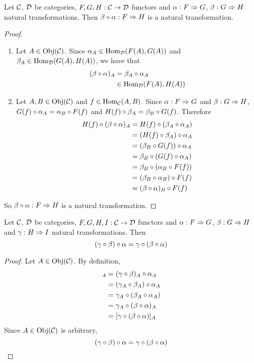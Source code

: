 \documentclass{book}
\begin{document}
	\begin{ex}  
		Let $\mathcal{C}$, $\mathcal{D}$ be categories, $F, G, H:\mathcal{C} \rightarrow \mathcal{D}$ functors and $\alpha: F \Rightarrow G$, $\beta : G \Rightarrow H$ natural transformations. Then $ \beta \circ \alpha: F \Rightarrow H$ is a natural transformation.
	\end{ex}
	
	\begin{proof}\
		\begin{enumerate}
			\item Let $A \in \operatorname{Obj}(\mathcal{C})$. Since $\alpha_A \in \operatorname{Hom}_{\mathcal{D}}(F(A), G(A))$ and $\beta_A \in \operatorname{Hom}_{\mathcal{D}}(G(A), H(A))$, we have that 
			\begin{align*}
				(\beta \circ \alpha)_A 
				& = \beta_A \circ \alpha_A \\
				& \in \operatorname{Hom}_{\mathcal{D}}(F(A), H(A))
			\end{align*}
			\item Let $A,B \in \operatorname{Obj}(\mathcal{C})$ and $f \in \operatorname{Hom}_{\mathcal{C}}(A,B)$. Since $\alpha:F \Rightarrow G$ and $\beta: G \Rightarrow H$, $G(f) \circ \alpha_A = \alpha_B \circ F(f)$ and $H(f) \circ \beta_A = \beta_B \circ G(f)$. Therefore 
			\begin{align*}
				H(f) \circ (\beta \circ \alpha)_A
				& = H(f) \circ (\beta_A \circ \alpha_A) \\
				& = (H(f) \circ \beta_A) \circ \alpha_A \\
				& = (\beta_B \circ G(f)) \circ \alpha_A \\
				& = \beta_B \circ (G(f)\circ \alpha_A) \\
				& = \beta_B \circ (\alpha_B \circ F(f)) \\
				& = (\beta_B \circ \alpha_B) \circ F(f) \\
				& = (\beta \circ \alpha)_B \circ F(f)
			\end{align*}
		\end{enumerate}
		So $\beta \circ \alpha: F \Rightarrow H$ is a natural transformation. 
	\end{proof}

	\begin{ex} 
		Let $\mathcal{C}$, $\mathcal{D}$ be categories, $F, G, H, I:\mathcal{C} \rightarrow \mathcal{D}$ functors and $\alpha: F \Rightarrow G$, $\beta : G \Rightarrow H$ and $\gamma: H \Rightarrow I$ natural transformations. Then $$(\gamma \circ \beta) \circ \alpha = \gamma \circ (\beta \circ \alpha)$$
	\end{ex}

	\begin{proof}
		Let $A \in \operatorname{Obj}(\mathcal{C})$. By definition,  
		\begin{align*}
			[(\gam \circ \be) \circ \al]_{A} 
			& = (\gam \circ \be)_A \circ \al_{A} \\
			& = (\gam_A \circ \be_A) \circ \al_A \\
			& = \gam_A \circ (\be_A \circ \al_A) \\
			& = \gam_A \circ (\be \circ \al)_A \\
			& = [\gam \circ (\be \circ \al)]_A \\
		\end{align*}
		Since $A \in \operatorname{Obj}(\mathcal{C})$ is arbitrary, 
		$$(\gamma \circ \beta) \circ \alpha = \gamma \circ (\beta \circ \alpha)$$
	\end{proof}
\end{document}
